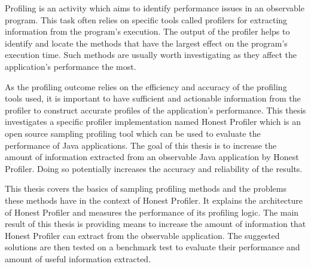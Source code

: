 \documentclass[..thesis.tex]{subfiles}
\begin{document}
Profiling is an activity which aims to identify performance issues in an observable program. This task often relies on specific tools called profilers for extracting information from the program's execution. The output of the profiler helps to identify and locate the methods that have the largest effect on the program's execution time. Such methods are usually worth investigating as they affect the application's performance the most. \cite{mytkowicz_evaluating_2010}

As the profiling outcome relies on the efficiency and accuracy of the profiling tools used,   it is important to have sufficient and actionable information from the profiler to construct accurate profiles of the application's performance. This thesis investigates a specific profiler implementation named Honest Profiler which is an open source sampling profiling tool which can be used to evaluate the performance of Java applications. The goal of this thesis is to increase the amount of information extracted from an observable Java application by Honest Profiler. Doing so potentially increases the accuracy and reliability of the results.  

This thesis covers the basics of sampling profiling methods and the problems these methods have in the context of Honest Profiler. It explains the architecture of Honest Profiler and measures the performance of its profiling logic. The main result of this thesis is providing means to increase the amount of information that Honest Profiler can extract from the observable application. The suggested solutions are then tested on a benchmark test to evaluate their performance and amount of useful information extracted.

\end{document}
